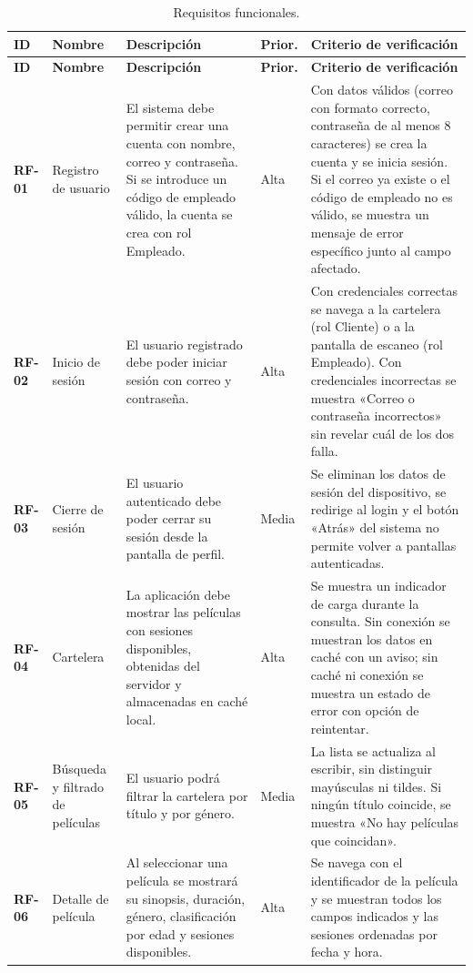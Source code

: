 \documentclass[11pt,a4paper]{article}
\begin{document}
\begin{longtable}{L{1.3cm} L{2.6cm} L{4.6cm} L{1.3cm} L{4.0cm}}
\caption{Requisitos funcionales.}\label{tab:rf}\\
\toprule
\textbf{ID} & \textbf{Nombre} & \textbf{Descripción} & \textbf{Prior.} & \textbf{Criterio de verificación} \\
\midrule
\endfirsthead
\toprule
\textbf{ID} & \textbf{Nombre} & \textbf{Descripción} & \textbf{Prior.} & \textbf{Criterio de verificación} \\
\midrule
\endhead
\bottomrule
\endlastfoot

\textbf{RF-01} & Registro de usuario & El sistema debe permitir crear una cuenta con nombre, correo y contraseña. Si se introduce un código de empleado válido, la cuenta se crea con rol Empleado. & Alta & Con datos válidos (correo con formato correcto, contraseña de al menos 8 caracteres) se crea la cuenta y se inicia sesión. Si el correo ya existe o el código de empleado no es válido, se muestra un mensaje de error específico junto al campo afectado. \\
\midrule
\textbf{RF-02} & Inicio de sesión & El usuario registrado debe poder iniciar sesión con correo y contraseña. & Alta & Con credenciales correctas se navega a la cartelera (rol Cliente) o a la pantalla de escaneo (rol Empleado). Con credenciales incorrectas se muestra «Correo o contraseña incorrectos» sin revelar cuál de los dos falla. \\
\midrule
\textbf{RF-03} & Cierre de sesión & El usuario autenticado debe poder cerrar su sesión desde la pantalla de perfil. & Media & Se eliminan los datos de sesión del dispositivo, se redirige al login y el botón «Atrás» del sistema no permite volver a pantallas autenticadas. \\
\midrule
\textbf{RF-04} & Cartelera & La aplicación debe mostrar las películas con sesiones disponibles, obtenidas del servidor y almacenadas en caché local. & Alta & Se muestra un indicador de carga durante la consulta. Sin conexión se muestran los datos en caché con un aviso; sin caché ni conexión se muestra un estado de error con opción de reintentar. \\
\midrule
\textbf{RF-05} & Búsqueda y filtrado de películas & El usuario podrá filtrar la cartelera por título y por género. & Media & La lista se actualiza al escribir, sin distinguir mayúsculas ni tildes. Si ningún título coincide, se muestra «No hay películas que coincidan». \\
\midrule
\textbf{RF-06} & Detalle de película & Al seleccionar una película se mostrará su sinopsis, duración, género, clasificación por edad y sesiones disponibles. & Alta & Se navega con el identificador de la película y se muestran todos los campos indicados y las sesiones ordenadas por fecha y hora. \\

\end{longtable}
\end{document}
